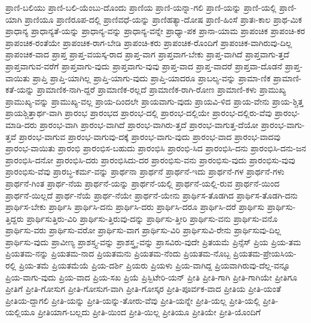 {ಪ್ರಾಣಿ-ಬಲಿಯು
ಪ್ರಾಣಿ-ಬಲಿ-ಯೆಂಬು-ದೊಂದು
ಪ್ರಾಣಿಯ
ಪ್ರಾಣಿ-ಯನ್ನಾ-ಗಲಿ
ಪ್ರಾಣಿ-ಯನ್ನು
ಪ್ರಾಣಿ-ಯಲ್ಲಿ
ಪ್ರಾಣಿ-ಯಾಗಿ
ಪ್ರಾಣಿಯೂ
ಪ್ರಾಣಿರೂಪ-ದಲ್ಲಿ
ಪ್ರಾಣಿವಧೆ-ಯನ್ನು
ಪ್ರಾಣಿಹತ್ಯಾ-ದೋಷ
ಪ್ರಾಣಿ-ಹಿಂಸೆ
ಪ್ರಾತಃ-ಕಾಲ
ಪ್ರಾಥ-ಮಿಕ
ಪ್ರಾಧಾನ್ಯ
ಪ್ರಾಧಾನ್ಯತೆ-ಯನ್ನು
ಪ್ರಾಧಾನ್ಯ-ವನ್ನು
ಪ್ರಾಧಾನ್ಯ-ವನ್ನೇ
ಪ್ರಾಧ್ಯಾ-ಪಕ
ಪ್ರಾನಾ-ಯಾಮ
ಪ್ರಾಪಂಚಿಕ
ಪ್ರಾಪಂಚಿ-ಕರ
ಪ್ರಾಪಂಚಿಕ-ರಂತೆಯೇ
ಪ್ರಾಪಂಚಿಕ-ರಾಗ-ಬೇಡಿ
ಪ್ರಾಪಂಚಿ-ಕರು
ಪ್ರಾಪಂಚಿಕ-ರೊಂದಿಗೆ
ಪ್ರಾಪಂಚಿಕ-ವಾಗಿರುವು-ದಿಲ್ಲ
ಪ್ರಾಪಂಚಿಕ-ವಾದ
ಪ್ರಾಪ್ತ
ಪ್ರಾಪ್ತ-ವಯಸ್ಕ-ರಾದ
ಪ್ರಾಪ್ತ-ವಾಗ
ಪ್ರಾಪ್ತವಾಗ-ಬೇಕು
ಪ್ರಾಪ್ತ-ವಾಗಿದೆ
ಪ್ರಾಪ್ತವಾಗು-ತ್ತದೆ
ಪ್ರಾಪ್ತವಾಗುವ-ವರೆಗೆ
ಪ್ರಾಪ್ತವಾಗು-ವುದು
ಪ್ರಾಪ್ತವಾಗು-ವುವು
ಪ್ರಾಪ್ತ-ವಾದ
ಪ್ರಾಪ್ತ-ವಾದರೆ
ಪ್ರಾಪ್ತವಾ-ದೊಡನೆ
ಪ್ರಾಪ್ತ-ವಾಯಿತು
ಪ್ರಾಪ್ತಿ
ಪ್ರಾಪ್ತಿ-ಯಾಗಿಲ್ಲ
ಪ್ರಾಪ್ತಿ-ಯಾಗು-ವುದು
ಪ್ರಾಪ್ತಿ-ಯಾದರೂ
ಪ್ರಾಬಲ್ಯ-ವನ್ನು
ಪ್ರಾಮಾ-ಣಿಕ
ಪ್ರಾಮಾಣಿ-ಕತೆ-ಯನ್ನು
ಪ್ರಾಮಾಣಿಕ-ನಾಗಿ-ದ್ದರೆ
ಪ್ರಾಮಾಣಿಕ-ರಲ್ಲದೆ
ಪ್ರಾಮಾಣಿಕ-ರಾಗಿ-ರೋಣ
ಪ್ರಾಮಾಣಿ-ಕಳು
ಪ್ರಾಮುಖ್ಯ
ಪ್ರಾಮುಖ್ಯ-ವನ್ನು
ಪ್ರಾಮುಖ್ಯ-ವಲ್ಲ
ಪ್ರಾಯ-ದಿಂದಲೇ
ಪ್ರಾಯವಾಗು-ವುದು
ಪ್ರಾಯವಿ-ಳಿದ
ಪ್ರಾಯ-ವೇನು
ಪ್ರಾಯ-ಶ್ಚಿತ್ತ
ಪ್ರಾಯಶ್ಚಿತ್ತಾರ್ಥ-ವಾಗಿ
ಪ್ರಾರಂಭ
ಪ್ರಾರಂಭದ
ಪ್ರಾರಂಭ-ದಲ್ಲಿ
ಪ್ರಾರಂಭ-ದಲ್ಲಿಯೇ
ಪ್ರಾರಂಭ-ದಲ್ಲಿರು-ವೆವು
ಪ್ರಾರಂಭ-ಮಾಡಿ-ದರು
ಪ್ರಾರಂಭ-ವಾಗಿ
ಪ್ರಾರಂಭ-ವಾಗಿದೆ
ಪ್ರಾರಂಭ-ವಾಗಿರು-ತ್ತದೆ
ಪ್ರಾರಂಭ-ವಾಗುತ್ತ-ದೆಯೋ
ಪ್ರಾರಂಭ-ವಾಗು-ತ್ತವೆ
ಪ್ರಾರಂಭ-ವಾಗುವ
ಪ್ರಾರಂಭ-ವಾಗುವು-ದಕ್ಕೆ
ಪ್ರಾರಂಭ-ವಾಗು-ವುದು
ಪ್ರಾರಂಭ-ವಾದ
ಪ್ರಾರಂಭ-ವಾದವು
ಪ್ರಾರಂಭ-ವಾಯಿತು
ಪ್ರಾರಂಭಿ
ಪ್ರಾರಂಭಿಸ-ಬಹುದು
ಪ್ರಾರಂಭಿಸಿ
ಪ್ರಾರಂಭಿ-ಸಿದ
ಪ್ರಾರಂಭಿಸಿ-ದನು
ಪ್ರಾರಂಭಿಸಿ-ದನು-ಜನ
ಪ್ರಾರಂಭಿಸಿ-ದನೋ
ಪ್ರಾರಂಭಿಸಿ-ದರು
ಪ್ರಾರಂಭಿಸಿದು-ದರ
ಪ್ರಾರಂಭಿಸು-ವನು
ಪ್ರಾರಂಭಿಸು-ವುದು
ಪ್ರಾರಂಭಿಸು-ವುವು
ಪ್ರಾರಂಭಿಸು-ವೆವು
ಪ್ರಾರಬ್ಧ-ಕರ್ಮ-ವನ್ನು
ಪ್ರಾರ್ಥನಾ
ಪ್ರಾರ್ಥನೆ
ಪ್ರಾರ್ಥನೆ-ಇದು
ಪ್ರಾರ್ಥನೆ-ಗಳ
ಪ್ರಾರ್ಥನೆ-ಗಳು
ಪ್ರಾರ್ಥನೆ-ಗಿಂತ
ಪ್ರಾರ್ಥ-ನೆಯ
ಪ್ರಾರ್ಥನೆ-ಯನ್ನು
ಪ್ರಾರ್ಥನೆ-ಯಲ್ಲಿ
ಪ್ರಾರ್ಥನೆ-ಯಲ್ಲಿ-ರುವ
ಪ್ರಾರ್ಥನೆ-ಯಿಂದ
ಪ್ರಾರ್ಥನೆ-ಯಿಲ್ಲದೆ
ಪ್ರಾರ್ಥ-ನೆಯೆ
ಪ್ರಾರ್ಥ-ನೆಯೇ
ಪ್ರಾರ್ಥನೆ-ಯೇನು
ಪ್ರಾರ್ಥಿಸ-ತೊಡಗಿದ
ಪ್ರಾರ್ಥಿಸ-ತೊಡಗಿ-ದನು
ಪ್ರಾರ್ಥಿಸ-ಬೇಕು
ಪ್ರಾರ್ಥಿಸಿ
ಪ್ರಾರ್ಥಿಸಿ-ದನು
ಪ್ರಾರ್ಥಿಸಿ-ದರು
ಪ್ರಾರ್ಥಿಸಿ-ದರೂ
ಪ್ರಾರ್ಥಿಸಿ-ದರೆ
ಪ್ರಾರ್ಥಿಸು
ಪ್ರಾರ್ಥಿಸು-ತ್ತಿದ್ದರು
ಪ್ರಾರ್ಥಿಸುತ್ತಿರು-ವಿರಿ
ಪ್ರಾರ್ಥಿಸು-ತ್ತಿರುವು-ದನ್ನು
ಪ್ರಾರ್ಥಿಸು-ತ್ತೀರಿ
ಪ್ರಾರ್ಥಿಸು-ವನು
ಪ್ರಾರ್ಥಿಸು-ವನೊ
ಪ್ರಾರ್ಥಿಸು-ವರು
ಪ್ರಾರ್ಥಿಸು-ವರೋ
ಪ್ರಾರ್ಥಿಸು-ವಾಗ
ಪ್ರಾರ್ಥಿಸು-ವಿರಿ
ಪ್ರಾರ್ಥಿಸುವಿ-ರೇನು
ಪ್ರಾರ್ಥಿಸುವು-ದಿಲ್ಲ
ಪ್ರಾರ್ಥಿಸು-ವುದು
ಪ್ರಾವೀಣ್ಯ
ಪ್ರಾಶಸ್ತ್ಯ-ವನ್ನು
ಪ್ರಾಶಸ್ತ್ರ್ಯ-ವನ್ನು
ಪ್ರಾಸವಿರು-ವುದೇ
ಪ್ರಿತಯಮೆ
ಪ್ರಿನ್ಸೆಸ್
ಪ್ರಿಯ
ಪ್ರಿಯ-ತಮ
ಪ್ರಿಯತಮ-ನನ್ನು
ಪ್ರಿಯತಮ-ನಾದ
ಪ್ರಿಯತಮನು
ಪ್ರಿಯತಮ-ನೆಂದು
ಪ್ರಿಯತಮ-ನೊಬ್ಬ
ಪ್ರಿಯತಮ-ಪ್ರೇಯಸಿಯ-ರಲ್ಲಿ
ಪ್ರಿಯ-ತಮೆ
ಪ್ರಿಯತಮೆಯೆ
ಪ್ರಿಯ-ದರ್ಶಿ
ಪ್ರಿಯರು
ಪ್ರಿಯಳು
ಪ್ರಿಯ-ವಾಗಿದ್ದ
ಪ್ರಿಯವಾಗಿರುವು-ದೆಲ್ಲ-ವನ್ನೂ
ಪ್ರಿಯ-ವಾಗು-ವುದು
ಪ್ರಿಯ-ವಾದ
ಪ್ರಿಯ-ಸಖ
ಪ್ರಿಯೆ
ಪ್ರಿಸ್ಬಿಟೇರಿ-ಯನ್
ಪ್ರೀತಿ
ಪ್ರೀತಿ-ಗಾಗಿ
ಪ್ರೀತಿ-ಗಾಗಿಯೇ
ಪ್ರೀತಿಗೂ
ಪ್ರೀತಿಗೆ
ಪ್ರೀತಿ-ಗೋಸುಗ
ಪ್ರೀತಿ-ಗೋಸುಗ-ವಾಗಿ
ಪ್ರೀತಿ-ಗೋಸ್ಕರ
ಪ್ರೀತಿ-ಪೂರ್ವಕ-ವಾದ
ಪ್ರೀತಿಯ
ಪ್ರೀತಿ-ಯಂತೆ
ಪ್ರೀತಿಯ-ದ್ದಾಗಲಿ
ಪ್ರೀತಿ-ಯನ್ನು
ಪ್ರೀತಿ-ಯನ್ನು-ತೋರು-ವೆವು
ಪ್ರೀತಿ-ಯನ್ನೇ
ಪ್ರೀತಿ-ಯಲ್ಲ
ಪ್ರೀತಿ-ಯಲ್ಲಿ
ಪ್ರೀತಿ-ಯಲ್ಲಿಯೂ
ಪ್ರೀತಿಯಾಗ-ಬಲ್ಲದು
ಪ್ರೀತಿ-ಯಿಂದ
ಪ್ರೀತಿ-ಯಿಲ್ಲ
ಪ್ರೀತಿಯೂ
ಪ್ರೀತಿಯೇ
ಪ್ರೀತಿ-ಯೊಂದಿಗೆ
}
